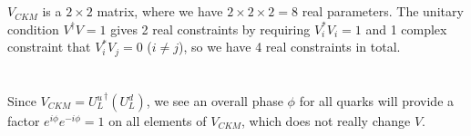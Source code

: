 \documentclass[11pt]{article}
\begin{document}
\section{}
$V_{CKM}$ is a $2 \times 2$ matrix, where we have $2\times 2\times 2=8$ real parameters. The unitary condition $V^\dagger V=1$ gives 2 real constraints by requiring $V_i^* V_i=1$ and 1 complex constraint that $V_i^* V_j=0$ ($i \neq j$), so we have 4 real constraints in total.

\section{ }
Since $V_{CKM} = {U^u_L}^\dagger (U^d_L)$, we see an overall phase $\phi$ for all quarks will provide a factor $e^{i \phi} e^{-i \phi}=1$ on all elements of $V_{CKM}$, which does not really change $V$.
\end{document}
